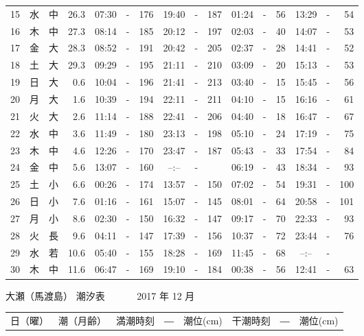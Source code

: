 \documentclass[12pt.a4j]{jsarticle}
\begin{document}
\begin{center}
\begin{table}[ht]
\begin{tabular}{|rc|cr|ccrccr|ccrccr|}
15 & 水 & 中 & 26.3 &  07:30 &-& 176  &  19:40 &-& 187  &   01:24 &-&  56  &   13:29 &-&  54  \\
16 & 木 & 中 & 27.3 &  08:14 &-& 185  &  20:12 &-& 197  &   02:03 &-&  40  &   14:07 &-&  53  \\
17 & 金 & 大 & 28.3 &  08:52 &-& 191  &  20:42 &-& 205  &   02:37 &-&  28  &   14:41 &-&  52  \\
18 & 土 & 大 & 29.3 &  09:29 &-& 195  &  21:11 &-& 210  &   03:09 &-&  20  &   15:13 &-&  53  \\
19 & 日 & 大 &  0.6 &  10:04 &-& 196  &  21:41 &-& 213  &   03:40 &-&  15  &   15:45 &-&  56  \\
20 & 月 & 大 &  1.6 &  10:39 &-& 194  &  22:11 &-& 211  &   04:10 &-&  15  &   16:16 &-&  61  \\
21 & 火 & 大 &  2.6 &  11:14 &-& 188  &  22:41 &-& 206  &   04:40 &-&  18  &   16:47 &-&  67  \\
22 & 水 & 中 &  3.6 &  11:49 &-& 180  &  23:13 &-& 198  &   05:10 &-&  24  &   17:19 &-&  75  \\
23 & 木 & 中 &  4.6 &  12:26 &-& 170  &  23:47 &-& 187  &   05:43 &-&  33  &   17:54 &-&  84  \\
24 & 金 & 中 &  5.6 &  13:07 &-& 160  &  --:-- &-&     &   06:19 &-&  43  &   18:34 &-&  93  \\
25 & 土 & 小 &  6.6 &  00:26 &-& 174  &  13:57 &-& 150  &   07:02 &-&  54  &   19:31 &-& 100  \\
26 & 日 & 小 &  7.6 &  01:16 &-& 161  &  15:07 &-& 145  &   08:01 &-&  64  &   20:58 &-& 101  \\
27 & 月 & 小 &  8.6 &  02:30 &-& 150  &  16:32 &-& 147  &   09:17 &-&  70  &   22:33 &-&  93  \\
28 & 火 & 長 &  9.6 &  04:11 &-& 147  &  17:39 &-& 156  &   10:37 &-&  72  &   23:44 &-&  76  \\
29 & 水 & 若 & 10.6 &  05:40 &-& 155  &  18:28 &-& 169  &   11:45 &-&  68  &   --:-- &-&     \\
30 & 木 & 中 & 11.6 &  06:47 &-& 169  &  19:10 &-& 184  &   00:38 &-&  56  &   12:41 &-&  63  \\
   \hline
   \end{tabular}
\end{table}
\newpage
 {\LARGE 大瀬（馬渡島）  潮汐表　　　}
 {\large 2017 年 12 月}\\
 \begin{table}[ht]
    \begin{tabular}{|rc|cr|ccrccr|ccrccr|}
    \hline
    \multicolumn{2}{|c|}{日（曜）} & \multicolumn{2}{c|}{潮（月齢）} & \multicolumn{6}{c|}{満潮時刻　―　潮位(cm)} & \multicolumn{6}{c|}{干潮時刻　―　潮位(cm)} \\

\end{tabular}
\end{table}
\end{center}
\end{document}
